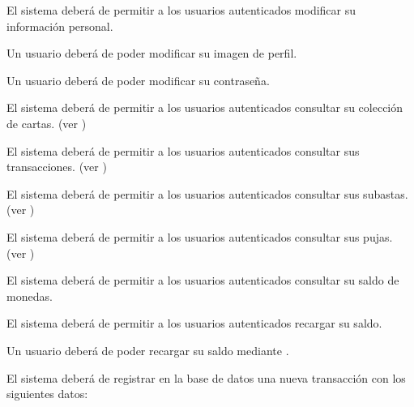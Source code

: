 

\begin{RFUsuarioAutenticado}
	\item El sistema deberá de permitir a los usuarios autenticados modificar su información personal.
    \begin{RFUsuarioAutenticado}
        \item Un usuario deberá de poder modificar su imagen de perfil.
        \item Un usuario deberá de poder modificar su contraseña.
    \end{RFUsuarioAutenticado}
    \item El sistema deberá de permitir a los usuarios autenticados consultar su colección de cartas. (ver )
    \item El sistema deberá de permitir a los usuarios autenticados consultar sus transacciones. (ver )
    \item El sistema deberá de permitir a los usuarios autenticados consultar sus subastas. (ver )
    \item El sistema deberá de permitir a los usuarios autenticados consultar sus pujas. (ver )
    \item El sistema deberá de permitir a los usuarios autenticados consultar su saldo de monedas. 
    \item El sistema deberá de permitir a los usuarios autenticados recargar su saldo.
    \begin{RFUsuarioAutenticado}
        \item Un usuario deberá de poder recargar su saldo mediante .
        \item El sistema deberá de registrar en la base de datos una nueva transacción con los siguientes datos:

\end{RFUsuarioAutenticado}
\end{RFUsuarioAutenticado}
